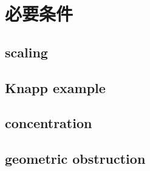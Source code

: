 \section{必要条件}
\label{b2:sec:2302}


\subsection{scaling}
\label{b2:subsec:230201}

\subsection{Knapp example}
\label{b2:subsec:230202}

\subsection{concentration}
\label{b2:subsec:230203}

\subsection{geometric obstruction}
\label{b2:subsec:230204}


